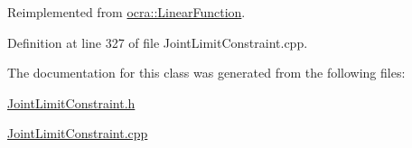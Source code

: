 Reimplemented from \hyperlink{classocra_1_1LinearFunction_a9857f074ea269801ce6f595b69593b32}{ocra\+::\+Linear\+Function}.



Definition at line 327 of file Joint\+Limit\+Constraint.\+cpp.



The documentation for this class was generated from the following files\+:\begin{DoxyCompactItemize}
\item 
\hyperlink{JointLimitConstraint_8h}{Joint\+Limit\+Constraint.\+h}\item 
\hyperlink{JointLimitConstraint_8cpp}{Joint\+Limit\+Constraint.\+cpp}\end{DoxyCompactItemize}
